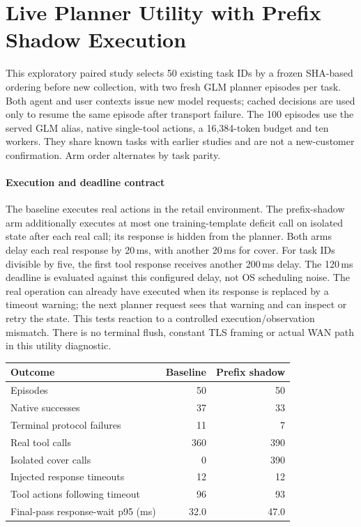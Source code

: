 \section{Live Planner Utility with Prefix Shadow Execution}\label{sec:live-planner-utility}
This exploratory paired study selects 50 existing task IDs by a frozen SHA-based ordering before new collection, with two fresh GLM planner episodes per task. Both agent and user contexts issue new model requests; cached decisions are used only to resume the same episode after transport failure. The 100 episodes use the served GLM alias, native single-tool actions, a 16,384-token budget and ten workers. They share known tasks with earlier studies and are not a new-customer confirmation. Arm order alternates by task parity.

\paragraph{Execution and deadline contract}
The baseline executes real actions in the retail environment. The prefix-shadow arm additionally executes at most one training-template deficit call on isolated state after each real call; its response is hidden from the planner. Both arms delay each real response by 20\,ms, with another 20\,ms for cover. For task IDs divisible by five, the first tool response receives another 200\,ms delay. The 120\,ms deadline is evaluated against this configured delay, not OS scheduling noise. The real operation can already have executed when its response is replaced by a timeout warning; the next planner request sees that warning and can inspect or retry the state. This tests reaction to a controlled execution/observation mismatch. There is no terminal flush, constant TLS framing or actual WAN path in this utility diagnostic.

\begin{center}\small\begin{tabular}{lrr}\toprule
Outcome & Baseline & Prefix shadow\\\midrule
Episodes & 50 & 50\\
Native successes & 37 & 33\\
Terminal protocol failures & 11 & 7\\
Real tool calls & 360 & 390\\
Isolated cover calls & 0 & 390\\
Injected response timeouts & 12 & 12\\
Tool actions following timeout & 96 & 93\\
Final-pass response-wait p95 (ms) & 32.0 & 47.0\\
\bottomrule\end{tabular}\end{center}

